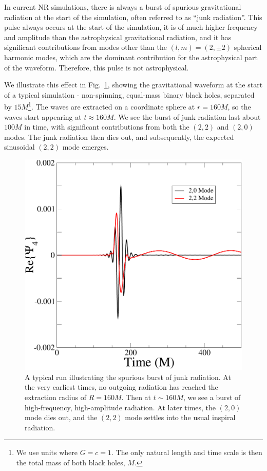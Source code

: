 In current NR simulations, there is always a burst of spurious
gravitational radiation at the start of the simulation, often referred to as
``junk radiation''. This pulse
always occurs at the start of the simulation, it is of much higher frequency and amplitude
than the astrophysical gravitational radiation, and it has significant
contributions from modes other than the $(l,m) = (2,\pm2)$
spherical harmonic modes, which are the dominant contribution for the
astrophysical part of the waveform.  Therefore, this pulse is not astrophysical.

We illustrate this effect in Fig.~\ref{fig:Typical}, showing the
gravitational waveform  at the start of a
typical simulation - non-spinning, equal-mass binary black holes, separated by $15M$\footnote{We use units where $G=c=1$. The only natural length
  and time scale is then the total mass of both black holes, $M$.}. The waves are extracted on a coordinate sphere at
$r=160M$, so
the waves start appearing at $t\approx 160M$. We see the burst of junk
radiation last about $100M$ in time, with significant contributions
from both the $(2,2)$ and $(2,0)$ modes. The junk radiation then dies out,
and subsequently, the expected sinusoidal $(2,2)$ mode emerges.

\begin{figure}
 \includegraphics[scale=0.95]{chap5/Typical}
  \caption[A typical run illustrating junk radation.]{A typical run illustrating the spurious burst of junk radiation. At the very earliest times, no outgoing radiation has reached the extraction radius of $R=160M$. Then at $t\sim160M$, we see a burst of high-frequency, high-amplitude radiation. At later times, the $(2,0)$ mode dies out, and the $(2,2)$ mode settles into the usual inspiral radiation.}
  \label{fig:Typical}
\end{figure}


